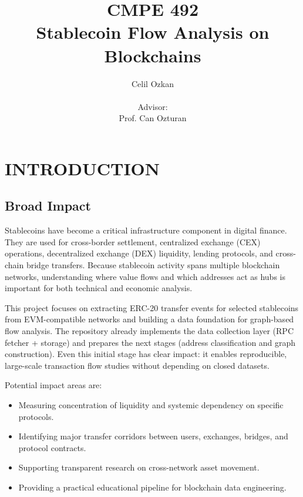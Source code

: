 \documentclass[a4paper,12pt]{report}
\begin{document}
\title{CMPE 492 \\ Stablecoin Flow Analysis on Blockchains}
\author{
Celil Ozkan \\ \\
Advisor: \\ 
Prof. Can Ozturan
}
\date{}
\maketitle{}
\tableofcontents

\chapter{INTRODUCTION}

\section{Broad Impact}
Stablecoins have become a critical infrastructure component in digital finance. They are used for
cross-border settlement, centralized exchange (CEX) operations, decentralized exchange (DEX)
liquidity, lending protocols, and cross-chain bridge transfers. Because stablecoin activity spans
multiple blockchain networks, understanding where value flows and which addresses act as hubs is
important for both technical and economic analysis.

This project focuses on extracting ERC-20 transfer events for selected stablecoins from
EVM-compatible networks and building a data foundation for graph-based flow analysis. The
repository already implements the data collection layer (RPC fetcher + storage) and prepares the
next stages (address classification and graph construction). Even this initial stage has clear impact:
it enables reproducible, large-scale transaction flow studies without depending on closed datasets.

Potential impact areas are:
\begin{itemize}
\item Measuring concentration of liquidity and systemic dependency on specific protocols.
\item Identifying major transfer corridors between users, exchanges, bridges, and protocol contracts.
\item Supporting transparent research on cross-network asset movement.
\item Providing a practical educational pipeline for blockchain data engineering.
\end{itemize}
\end{document}
